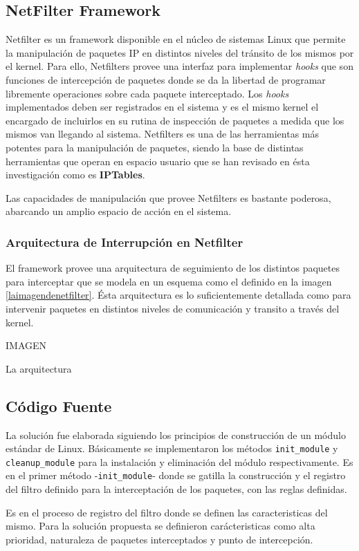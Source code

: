 \subsection{NetFilter Framework}
Netfilter es un framework disponible en el núcleo de sistemas Linux que permite la manipulación de paquetes IP en distintos niveles del tránsito de los mismos por el kernel. Para ello, Netfilters provee una interfaz para implementar \emph{hooks} que son funciones de intercepción de paquetes donde se da la libertad de programar libremente operaciones sobre cada paquete interceptado. Los \emph{hooks} implementados deben ser registrados en el sistema y es el mismo kernel el encargado de incluirlos en su rutina de inspección de paquetes a medida que los mismos van llegando al sistema. Netfilters es una de las herramientas más potentes para la manipulación de paquetes, siendo la base de distintas herramientas que operan en espacio usuario que se han revisado en ésta investigación como es \textbf{IPTables}.

Las capacidades de manipulación que provee Netfilters es bastante poderosa, abarcando un amplio espacio de acción en el sistema.

\subsubsection{Arquitectura de Interrupción en Netfilter}
El framework provee una arquitectura de seguimiento de los distintos paquetes para interceptar que se modela en un esquema como el definido en la imagen \ref{laimagendenetfilter}. Ésta arquitectura es lo suficientemente detallada como para intervenir paquetes en distintos niveles de comunicación y transito a través del kernel.

IMAGEN

La arquitectura


\subsection{Código Fuente}
La solución fue elaborada siguiendo los principios de construcción de un módulo estándar de Linux. Básicamente se implementaron los métodos \verb=init_module= y \verb=cleanup_module= para la instalación y eliminación del módulo respectivamente. Es en el primer método -\verb=init_module=- donde se gatilla la construcción y el registro del filtro definido para la interceptación de los paquetes, con las reglas definidas.

Es en el proceso de registro del filtro donde se definen las caracteristicas del mismo. Para la solución propuesta se definieron carácteristicas como alta prioridad, naturaleza de paquetes interceptados y punto de intercepción.


